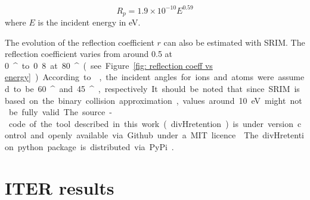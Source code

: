 \begin{equation}
    R_p = 1.9\times 10^{-10} E ^{0.59}
    \label{eq: implantation range}
\end{equation}
where $E$ is the incident energy in \si{eV}.

The evolution of the reflection coefficient $r$ can also be estimated with SRIM.
The reflection coefficient varies from around 0.5 at \SI{0}{^\circ} to 0.8 at \SI{80}{^\circ} (see Figure \ref{fig: reflection coeff vs energy}).
According to , the incident angles for ions and atoms were assumed to be \SI{60}{^\circ} and \SI{45}{^\circ}, respectively.
It should be noted that since SRIM is based on the binary collision approximation, values around \SI{10}{eV} might not be fully valid.

The source-code of the tool described in this work (divHretention) is under version control and openly available via Github under a MIT licence .
The divHretention python package is distributed via PyPi .



\section{ITER results}





